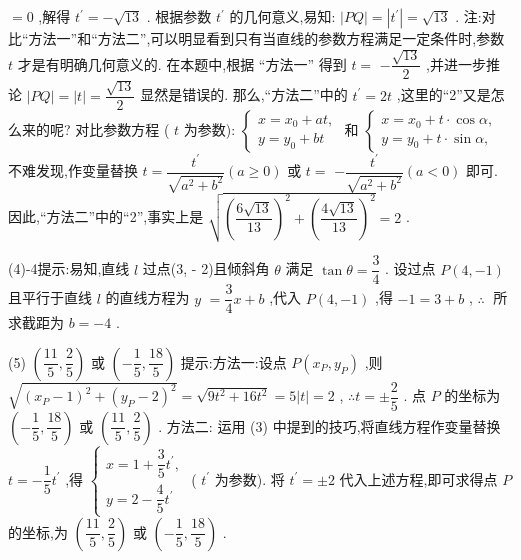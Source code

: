 $= 0$ ,解得 ${t}^{\prime } =  - \sqrt{13}$ . 根据参数 ${t}^{\prime }$ 的几何意义,易知: $\left| {PQ}\right|  = \left| {t}^{\prime }\right|  = \sqrt{13}$ . 注:对比“方法一”和“方法二”,可以明显看到只有当直线的参数方程满足一定条件时,参数 $t$ 才是有明确几何意义的. 在本题中,根据 “方法一” 得到 $t =$  $- \dfrac{\sqrt{13}}{2}$ ,并进一步推论 $\left| {PQ}\right|  = \left| t\right|  = \dfrac{\sqrt{13}}{2}$ 显然是错误的. 那么,“方法二”中的 ${t}^{\prime } = {2t}$ ,这里的“2”又是怎么来的呢? 对比参数方程 ( $t$ 为参数): $\left\{  \begin{array}{l} x = {x}_{0} + {at}, \\  y = {y}_{0} + {bt} \end{array}\right.$ 和 $\left\{  \begin{array}{l} x = {x}_{0} + t \cdot  \cos \alpha , \\  y = {y}_{0} + t \cdot  \sin \alpha , \end{array}\right.$ 不难发现,作变量替换 $t = \dfrac{{t}^{\prime }}{\sqrt{{a}^{2} + {b}^{2}}}\left( {a \geq  0}\right)$ 或 $t =$  $- \dfrac{{t}^{\prime }}{\sqrt{{a}^{2} + {b}^{2}}}\left( {a < 0}\right)$ 即可. 因此,“方法二”中的“2”,事实上是 $\sqrt{{\left( \dfrac{6\sqrt{13}}{13}\right) }^{2} + {\left( \dfrac{4\sqrt{13}}{13}\right) }^{2}} = 2$ .

(4)-4提示:易知,直线 $l$ 过点(3, - 2)且倾斜角 $\theta$ 满足 $\tan \theta  = \dfrac{3}{4}$ . 设过点 $P\left( {4, - 1}\right)$ 且平行于直线 $l$ 的直线方程为 $y$  $= \dfrac{3}{4}x + b$ ,代入 $P\left( {4, - 1}\right)$ ,得 $- 1 = 3 + b$ , $\therefore \;$ 所求截距为 $b =  - 4$ .

(5) $\left( {\dfrac{11}{5},\dfrac{2}{5}}\right)$ 或 $\left( {-\dfrac{1}{5},\dfrac{18}{5}}\right)$ 提示:方法一:设点 $P\left( {{x}_{P},{y}_{P}}\right)$ ,则 $\sqrt{{\left( {x}_{P} - 1\right) }^{2} + {\left( {y}_{P} - 2\right) }^{2}} = \sqrt{9{t}^{2} + {16}{t}^{2}} = 5\left| t\right|  = 2$ , $\therefore t =  \pm  \dfrac{2}{5}$ . 点 $P$ 的坐标为 $\left( {-\dfrac{1}{5},\dfrac{18}{5}}\right)$ 或 $\left( {\dfrac{11}{5},\dfrac{2}{5}}\right)$ . 方法二: 运用 (3) 中提到的技巧,将直线方程作变量替换 $t =  - \dfrac{1}{5}{t}^{\prime }$ ,得 $\left\{  \begin{array}{l} x = 1 + \dfrac{3}{5}{t}^{\prime }, \\  y = 2 - \dfrac{4}{5}{t}^{\prime } \end{array}\right.$ ( ${t}^{\prime }$ 为参数). 将 ${t}^{\prime } =  \pm  2$ 代入上述方程,即可求得点 $P$ 的坐标,为 $\left( {\dfrac{11}{5},\dfrac{2}{5}}\right)$ 或 $\left( {-\dfrac{1}{5},\dfrac{18}{5}}\right)$ .

